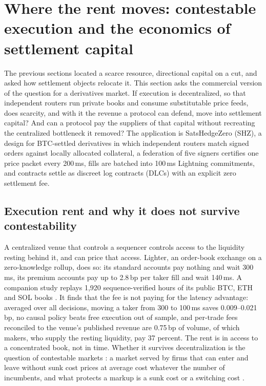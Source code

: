\section{Where the rent moves: contestable execution and the economics of settlement capital}
\label{sec:rent}

The previous sections located a scarce resource, directional capital on a cut, and asked how settlement objects relocate it. This section asks the commercial version of the question for a derivatives market. If execution is decentralized, so that independent routers run private books and consume substitutable price feeds, does scarcity, and with it the revenue a protocol can defend, move into settlement capital? And can a protocol pay the suppliers of that capital without recreating the centralized bottleneck it removed? The application is SatsHedgeZero (SHZ), a design for BTC-settled derivatives in which independent routers match signed orders against locally allocated collateral, a federation of five signers certifies one price packet every 200\,ms, fills are batched into 100\,ms Lightning commitments, and contracts settle as discreet log contracts (DLCs) with an explicit zero settlement fee.

\subsection{Execution rent and why it does not survive contestability}
\label{sec:rent-exec}

A centralized venue that controls a sequencer controls access to the liquidity resting behind it, and can price that access. Lighter, an order-book exchange on a zero-knowledge rollup, does so: its standard accounts pay nothing and wait 300\,ms, its premium accounts pay up to 2.8\,bp per taker fill and wait 140\,ms. A companion study replays 1{,}920 sequence-verified hours of its public BTC, ETH and SOL books \citep{dugan2026latency}. It finds that the fee is not paying for the latency advantage: averaged over all decisions, moving a taker from 300 to 100\,ms saves 0.009--0.021\,bp, no causal policy beats free execution out of sample, and per-trade fees reconciled to the venue's published revenue are 0.75\,bp of volume, of which makers, who supply the resting liquidity, pay 37 percent. The rent is in access to a concentrated book, not in time. Whether it survives decentralization is the question of contestable markets \citep{baumol1982contestable}: a market served by firms that can enter and leave without sunk cost prices at average cost whatever the number of incumbents, and what protects a markup is a sunk cost or a switching cost \citep{klemperer1987switching}.

